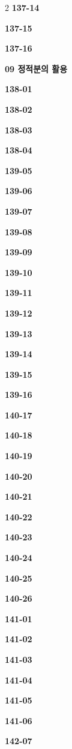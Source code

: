 \documentclass[10pt,a4paper]{article}
\begin{document}
\begin{multicols}{2}
\noindent\textbf{137-14}\ \par
\noindent\textbf{137-15}\ \par
\noindent\textbf{137-16}\ \par
\noindent\textbf{09 정적분의 활용}\par\smallskip
\noindent\textbf{138-01}\ \par
\noindent\textbf{138-02}\ \par
\noindent\textbf{138-03}\ \par
\noindent\textbf{138-04}\ \par
\noindent\textbf{139-05}\ \par
\noindent\textbf{139-06}\ \par
\noindent\textbf{139-07}\ \par
\noindent\textbf{139-08}\ \par
\noindent\textbf{139-09}\ \par
\noindent\textbf{139-10}\ \par
\noindent\textbf{139-11}\ \par
\noindent\textbf{139-12}\ \par
\noindent\textbf{139-13}\ \par
\noindent\textbf{139-14}\ \par
\noindent\textbf{139-15}\ \par
\noindent\textbf{139-16}\ \par
\noindent\textbf{140-17}\ \par
\noindent\textbf{140-18}\ \par
\noindent\textbf{140-19}\ \par
\noindent\textbf{140-20}\ \par
\noindent\textbf{140-21}\ \par
\noindent\textbf{140-22}\ \par
\noindent\textbf{140-23}\ \par
\noindent\textbf{140-24}\ \par
\noindent\textbf{140-25}\ \par
\noindent\textbf{140-26}\ \par
\noindent\textbf{141-01}\ \par
\noindent\textbf{141-02}\ \par
\noindent\textbf{141-03}\ \par
\noindent\textbf{141-04}\ \par
\noindent\textbf{141-05}\ \par
\noindent\textbf{141-06}\ \par
\noindent\textbf{142-07}\ \par

\end{multicols}
\end{document}

